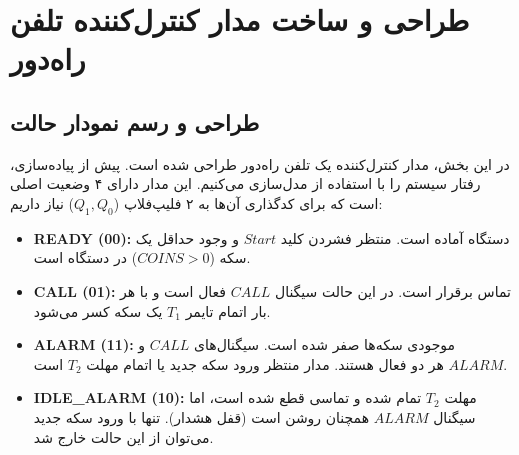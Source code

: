 \documentclass[12pt]{article}
\begin{document}
	\clearpage
	
	\section{طراحی و ساخت مدار کنترل‌کننده تلفن راه‌دور}
	
	\subsection{طراحی و رسم نمودار حالت}
	در این بخش، مدار کنترل‌کننده یک تلفن راه‌دور طراحی شده است. پیش از پیاده‌سازی، رفتار سیستم را با استفاده از مدل‌سازی می‌کنیم. این مدار دارای ۴ وضعیت اصلی است که برای کدگذاری آن‌ها به ۲ فلیپ‌فلاپ ($Q_1, Q_0$) نیاز داریم:
	
	\begin{itemize}
		\item \textbf{READY (00):} دستگاه آماده است. منتظر فشردن کلید $Start$ و وجود حداقل یک سکه ($COINS>0$) در دستگاه است.
		\item \textbf{CALL (01):} تماس برقرار است. در این حالت سیگنال $CALL$ فعال است و با هر بار اتمام تایمر $T_1$ یک سکه کسر می‌شود.
		\item \textbf{ALARM (11):} موجودی سکه‌ها صفر شده است. سیگنال‌های $CALL$ و $ALARM$ هر دو فعال هستند. مدار منتظر ورود سکه جدید یا اتمام مهلت $T_2$ است.
		\item \textbf{IDLE\_ALARM (10):} مهلت $T_2$ تمام شده و تماسی قطع شده است، اما سیگنال $ALARM$ همچنان روشن است (قفل هشدار). تنها با ورود سکه جدید می‌توان از این حالت خارج شد.
	\end{itemize}
	
\end{document}
